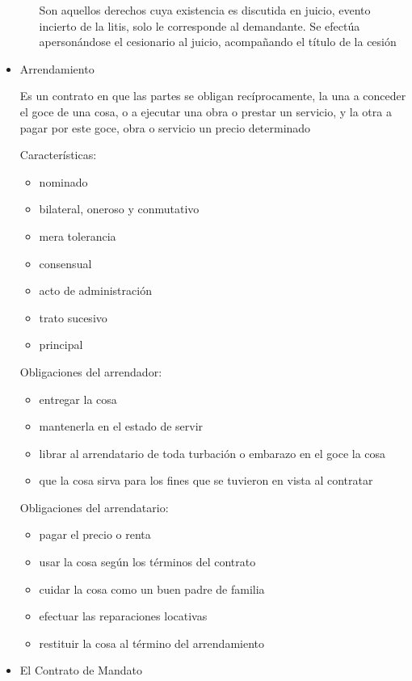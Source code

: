 \documentclass[]{article}
\providecommand{\tightlist}{%
  \setlength{\itemsep}{0pt}\setlength{\parskip}{0pt}}
\begin{document}
\begin{itemize}
\begin{itemize}
    Son aquellos derechos cuya existencia es discutida en juicio, evento
    incierto de la litis, solo le corresponde al demandante. Se efectúa
    apersonándose el cesionario al juicio, acompañando el título de la
    cesión
  \end{itemize}
\item
  Arrendamiento

  Es un contrato en que las partes se obligan recíprocamente, la una a
  conceder el goce de una cosa, o a ejecutar una obra o prestar un
  servicio, y la otra a pagar por este goce, obra o servicio un precio
  determinado

  Características:

  \begin{itemize}
  \tightlist
  \item
    nominado
  \item
    bilateral, oneroso y conmutativo
  \item
    mera tolerancia
  \item
    consensual
  \item
    acto de administración
  \item
    trato sucesivo
  \item
    principal
  \end{itemize}

  Obligaciones del arrendador:

  \begin{itemize}
  \tightlist
  \item
    entregar la cosa
  \item
    mantenerla en el estado de servir
  \item
    librar al arrendatario de toda turbación o embarazo en el goce la
    cosa
  \item
    que la cosa sirva para los fines que se tuvieron en vista al
    contratar
  \end{itemize}

  Obligaciones del arrendatario:

  \begin{itemize}
  \tightlist
  \item
    pagar el precio o renta
  \item
    usar la cosa según los términos del contrato
  \item
    cuidar la cosa como un buen padre de familia
  \item
    efectuar las reparaciones locativas
  \item
    restituir la cosa al término del arrendamiento
  \end{itemize}
\item
  El Contrato de Mandato


\end{itemize}
\end{document}

